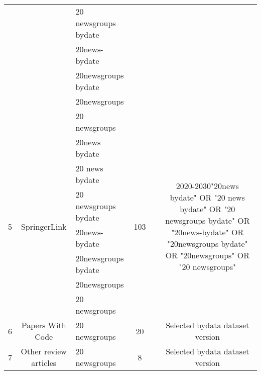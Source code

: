 \documentclass{article}
\begin{document}
\begin{table}[htbp]
\begin{tabular}{cclccccccc}
          &       & \multicolumn{1}{p{10.145em}}{20 newsgroups bydate} & \multicolumn{3}{c}{}  & \multicolumn{3}{c}{}  &  \\
          &       & \multicolumn{1}{p{10.145em}}{20news-bydate} & \multicolumn{3}{c}{}  & \multicolumn{3}{c}{}  &  \\
          &       & 20newsgroups bydate & \multicolumn{3}{c}{}  & \multicolumn{3}{c}{}  &  \\
          &       & 20newsgroups & \multicolumn{3}{c}{}  & \multicolumn{3}{c}{}  &  \\
          &       & 20 newsgroups & \multicolumn{3}{c}{}  & \multicolumn{3}{c}{}  &  \\
    \multirow{7}[0]{*}{5} & \multicolumn{1}{c}{\multirow{7}[0]{*}{SpringerLink}} & \multicolumn{1}{p{10.145em}}{20news bydate} & \multicolumn{3}{c}{\multirow{7}[0]{*}{103}} & \multicolumn{3}{c}{}  & \multicolumn{1}{c}{\multirow{7}[0]{*}{2020-2030\newline{}"20news bydate" OR "20 news bydate" OR "20 newsgroups bydate" OR "20news-bydate" OR "20newsgroups bydate" OR "20newsgroups" OR "20 newsgroups"}} \\
          &       & \multicolumn{1}{p{10.145em}}{20 news bydate} & \multicolumn{3}{c}{}  & \multicolumn{3}{c}{}  &  \\
          &       & \multicolumn{1}{p{10.145em}}{20 newsgroups bydate} & \multicolumn{3}{c}{}  & \multicolumn{3}{c}{}  &  \\
          &       & \multicolumn{1}{p{10.145em}}{20news-bydate} & \multicolumn{3}{c}{}  & \multicolumn{3}{c}{}  &  \\
          &       & 20newsgroups bydate & \multicolumn{3}{c}{}  & \multicolumn{3}{c}{}  &  \\
          &       & 20newsgroups & \multicolumn{3}{c}{}  & \multicolumn{3}{c}{}  &  \\
          &       & 20 newsgroups & \multicolumn{3}{c}{}  & \multicolumn{3}{c}{}  &  \\
    \multirow{5}[0]{*}{6} & \multirow{5}[0]{*}{Papers With Code} & \multirow{5}[0]{*}{20 newsgroups } & \multicolumn{3}{c}{\multirow{5}[0]{*}{20}} & \multicolumn{3}{c}{}  & \multicolumn{1}{c}{\multirow{5}[0]{*}{Selected bydata dataset version}} \\
          &       &       & \multicolumn{3}{c}{}  & \multicolumn{3}{c}{}  &  \\
          &       &       & \multicolumn{3}{c}{}  & \multicolumn{3}{c}{}  &  \\
          &       &       & \multicolumn{3}{c}{}  & \multicolumn{3}{c}{}  &  \\
          &       &       & \multicolumn{3}{c}{}  & \multicolumn{3}{c}{}  &  \\
    7     & Other review articles & 20 newsgroups  & \multicolumn{3}{c}{8} & \multicolumn{3}{c}{}  & Selected bydata dataset version \\
    \end{tabular}%
  \label{tab:addlabel}%
\end{table}%
\end{document}
